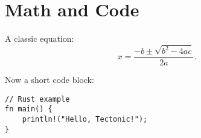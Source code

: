 \section{Math and Code}

A classic equation:
\[
x = \frac{-b \pm \sqrt{b^2 - 4ac}}{2a}.
\]

Now a short code block:

\begin{lstlisting}
// Rust example
fn main() {
    println!("Hello, Tectonic!");
}
\end{lstlisting}

